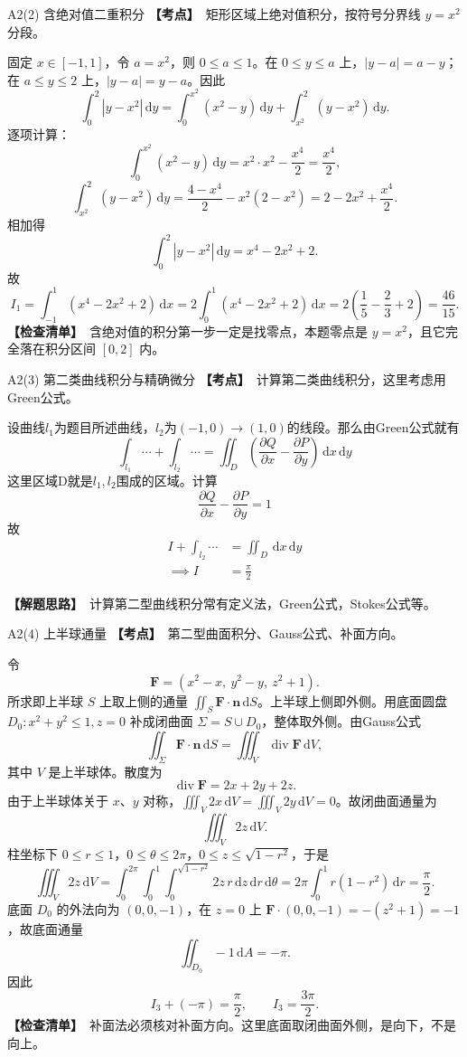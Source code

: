 \documentclass[UTF8,zihao=-4,openany]{ctexbook}
\newcommand{\dd}{\,\mathrm{d}}
\newcommand{\diver}{\operatorname{div}}
\newcommand{\thinking}{\textcolor{mainblue}{\bfseries【解题思路】}}
\newcommand{\point}{\textcolor{warnred}{\bfseries【考点】}}
\newcommand{\checklist}{\textcolor{theogreen}{\bfseries【检查清单】}}
\begin{document}
\begin{solutionbox}{A2(2) 含绝对值二重积分}
\point\ 矩形区域上绝对值积分，按符号分界线 $y=x^2$ 分段。

固定 $x\in[-1,1]$，令 $a=x^2$，则 $0\le a\le1$。在 $0\le y\le a$ 上，$|y-a|=a-y$；在 $a\le y\le2$ 上，$|y-a|=y-a$。因此
\[
\int_0^2|y-x^2|\dd y
=\int_0^{x^2}(x^2-y)\dd y+\int_{x^2}^{2}(y-x^2)\dd y.
\]
逐项计算：
\[
\int_0^{x^2}(x^2-y)\dd y=x^2\cdot x^2-\frac{x^4}{2}=\frac{x^4}{2},
\]
\[
\int_{x^2}^{2}(y-x^2)\dd y=\frac{4-x^4}{2}-x^2(2-x^2)=2-2x^2+\frac{x^4}{2}.
\]
相加得
\[
\int_0^2|y-x^2|\dd y=x^4-2x^2+2.
\]
故
\[
I_1=\int_{-1}^{1}(x^4-2x^2+2)\dd x
=2\int_0^1(x^4-2x^2+2)\dd x
=2\left(\frac15-\frac23+2\right)=\boxed{\frac{46}{15}}.
\]
\checklist\ 含绝对值的积分第一步一定是找零点，本题零点是 $y=x^2$，且它完全落在积分区间 $[0,2]$ 内。
\end{solutionbox}

\begin{solutionbox}{A2(3) 第二类曲线积分与精确微分}
\point\ 计算第二类曲线积分，这里考虑用Green公式。

设曲线\(l_1\)为题目所述曲线，\(l_2\)为\((-1,0)\to(1,0)\)的线段。那么由Green公式就有\[
    \int_{l_1}\cdots+\int_{l_2}\cdots=\iint_{D}(\frac{\partial Q}{\partial x}-\frac{\partial P}{\partial y})\dd x\dd y
\]这里区域D就是\(l_1,l_2\)围成的区域。计算\[
\frac{\partial Q}{\partial x}-\frac{\partial P}{\partial y}=1
\]故\begin{align*}
    I+\int_{l_2}\cdots&=\iint_{D}\dd x\dd y\\
 \implies I&=\frac{\pi}{2}
\end{align*}

\thinking\ 计算第二型曲线积分常有定义法，Green公式，Stokes公式等。
\end{solutionbox}

\begin{solutionbox}{A2(4) 上半球通量}
\point\ 第二型曲面积分、Gauss公式、补面方向。

令
\[
\bm F=(x^2-x,\ y^2-y,\ z^2+1).
\]
所求即上半球 $S$ 上取上侧的通量 $\iint_S\bm F\cdot\bm n\dd S$。上半球上侧即外侧。用底面圆盘 $D_0:x^2+y^2\le1,z=0$ 补成闭曲面 $\Sigma=S\cup D_0$，整体取外侧。由Gauss公式
\[
\iint_\Sigma \bm F\cdot\bm n\dd S=\iiint_V\diver \bm F\dd V,
\]
其中 $V$ 是上半球体。散度为
\[
\diver\bm F=2x+2y+2z.
\]
由于上半球体关于 $x$、$y$ 对称，$\iiint_V2x\dd V=\iiint_V2y\dd V=0$。故闭曲面通量为
\[
\iiint_V2z\dd V.
\]
柱坐标下 $0\le r\le1$，$0\le\theta\le2\pi$，$0\le z\le\sqrt{1-r^2}$，于是
\[
\iiint_V2z\dd V=\int_0^{2\pi}\int_0^1\int_0^{\sqrt{1-r^2}}2z\,r\dd z\dd r\dd\theta
=2\pi\int_0^1 r(1-r^2)\dd r=\frac{\pi}{2}.
\]
底面 $D_0$ 的外法向为 $(0,0,-1)$，在 $z=0$ 上 $\bm F\cdot(0,0,-1)=-(z^2+1)=-1$，故底面通量
\[
\iint_{D_0}-1\dd A=-\pi.
\]
因此
\[
I_3+(-\pi)=\frac{\pi}{2},
\qquad
\boxed{I_3=\frac{3\pi}{2}.}
\]
\checklist\ 补面法必须核对补面方向。这里底面取闭曲面外侧，是向下，不是向上。
\end{solutionbox}
\end{document}
